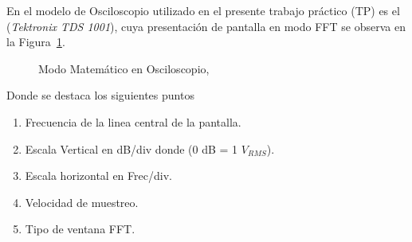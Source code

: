     En el modelo de Osciloscopio utilizado en el presente trabajo práctico (TP) es el  
    (\textit{Tektronix TDS 1001}), cuya presentación de pantalla en modo FFT se observa en 
    la Figura~\ref{fig:MathModoEnTek}.   
        \begin{figure}[H]
            \centering
            \caption{Modo Matemático en Osciloscopio,}
            \label{fig:MathModoEnTek}
        \end{figure}
    Donde se destaca los siguientes puntos 
    \begin{enumerate}
        \item Frecuencia de la linea central de la pantalla.
        \item Escala Vertical en dB/div donde (0 dB = 1 \(V_{RMS}\)).
        \item Escala horizontal en Frec/div.
        \item Velocidad de muestreo. 
        \item Tipo de ventana FFT. 
    \end{enumerate}    

